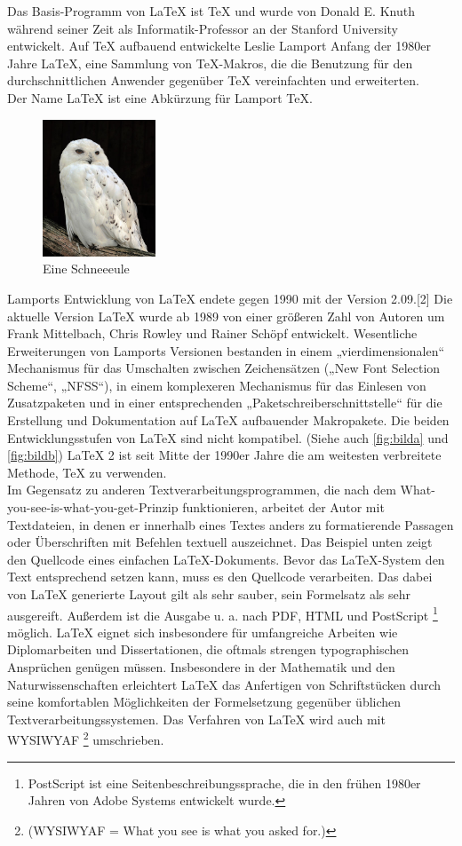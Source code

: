 \documentclass{scrreprt}
\begin{document}
Das Basis-Programm von LaTeX ist TeX und wurde von Donald E. Knuth während seiner Zeit als Informatik-Professor an der Stanford University entwickelt. Auf TeX aufbauend entwickelte Leslie Lamport Anfang der 1980er Jahre LaTeX, eine Sammlung von TeX-Makros, die die Benutzung für den durchschnittlichen Anwender gegenüber TeX vereinfachten und erweiterten. 
\\ Der Name LaTeX ist eine Abkürzung für Lamport TeX.
\begin{figure}
\includegraphics[width=0.3\textwidth]{images/396px-Bubo_scandiacus_(Linnaeus,_1758)_Male.jpg}
\caption{Eine Schneeeule \cite{ref3}}
\label{fig:schneeeule}
\end{figure}{} 
Lamports Entwicklung von LaTeX endete gegen 1990 mit der Version 2.09.[2] Die aktuelle Version LaTeX wurde ab 1989 von einer größeren Zahl von Autoren um Frank Mittelbach, Chris Rowley und Rainer Schöpf entwickelt. Wesentliche Erweiterungen von Lamports Versionen bestanden in einem „vierdimensionalen“ Mechanismus für das Umschalten zwischen Zeichensätzen („New Font Selection Scheme“, „NFSS“), in einem komplexeren Mechanismus für das Einlesen von Zusatzpaketen und in einer entsprechenden „Paketschreiberschnittstelle“ für die Erstellung und Dokumentation auf LaTeX aufbauender Makropakete. Die beiden Entwicklungsstufen von LaTeX sind nicht kompatibel. (Siehe auch \ref{fig:bilda} und \ref{fig:bildb})
LaTeX 2 ist seit Mitte der 1990er Jahre die am weitesten verbreitete Methode, TeX zu verwenden.\\
Im Gegensatz zu anderen Textverarbeitungsprogrammen, die nach dem What-you-see-is-what-you-get-Prinzip funktionieren, arbeitet der Autor mit Textdateien, in denen er innerhalb eines Textes anders zu formatierende Passagen oder Überschriften mit Befehlen textuell auszeichnet. Das Beispiel unten zeigt den Quellcode eines einfachen LaTeX-Dokuments. Bevor das LaTeX-System den Text entsprechend setzen kann, muss es den Quellcode verarbeiten. Das dabei von LaTeX generierte Layout gilt als sehr sauber, sein Formelsatz als sehr ausgereift. Außerdem ist die Ausgabe u. a. nach PDF, HTML und PostScript \footnote{PostScript ist eine Seitenbeschreibungssprache, die in den frühen 1980er Jahren von Adobe Systems entwickelt wurde.} möglich. LaTeX eignet sich insbesondere für umfangreiche Arbeiten wie Diplomarbeiten und Dissertationen, die oftmals strengen typographischen Ansprüchen genügen müssen. Insbesondere in der Mathematik und den Naturwissenschaften erleichtert LaTeX das Anfertigen von Schriftstücken durch seine komfortablen Möglichkeiten der Formelsetzung gegenüber üblichen Textverarbeitungssystemen. Das Verfahren von LaTeX wird auch mit WYSIWYAF \footnote{(WYSIWYAF = What you see is what you asked for.)}  umschrieben. 
\end{document}
